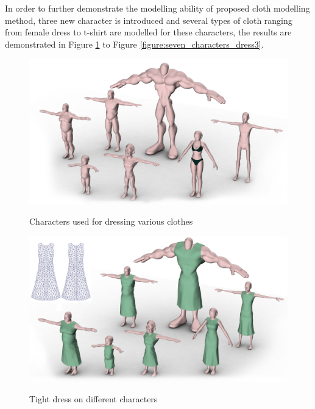In order to further demonstrate the modelling ability of proposed cloth modelling method, three new character is introduced and several types of cloth ranging from female dress to t-shirt are modelled for these characters, the results are demonstrated in Figure \ref{figure:seven_characters_model} to Figure \ref{figure:seven_characters_dress3}. 

\begin{figure}[H]
	\centering
	\includegraphics[width=1.0\columnwidth]{../images/7_characters}\\[0.1cm]
    \caption{Characters used for dressing various clothes}
    \label{figure:seven_characters_model}
\end{figure}

\begin{figure}[H]
	\centering
	\includegraphics[width=1.0\columnwidth]{../images/7_characters_dress1}\\[0.1cm]
    \caption{Tight dress on different characters}
    \label{figure:seven_characters_dress1}
\end{figure}

